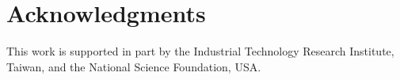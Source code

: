 \section*{Acknowledgments}
This work is supported in part by the Industrial Technology Research Institute, Taiwan, and the National Science Foundation, USA.
